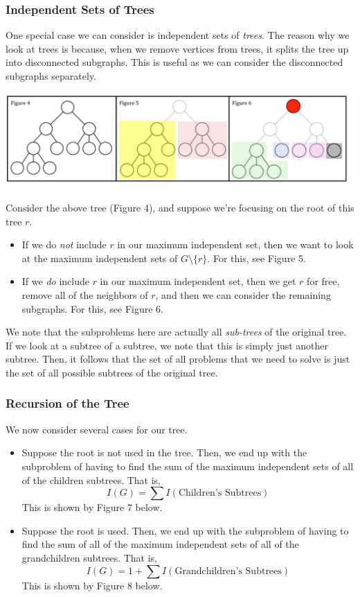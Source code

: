 \documentclass[letterpaper]{article}
\begin{document}
\subsubsection{Independent Sets of Trees}
One special case we can consider is independent sets of \emph{trees}. The reason why we look at trees is because, when we remove vertices from trees, it splits the tree up into disconnected subgraphs. This is useful as we can consider the disconnected subgraphs separately.
\begin{center}
    \includegraphics[scale=0.35]{../assets/indep_set_tree.png}
\end{center}
Consider the above tree (Figure 4), and suppose we're focusing on the root of this tree $r$.
\begin{itemize}
    \item If we do \emph{not} include $r$ in our maximum independent set, then we want to look at the maximum independent sets of $G \setminus \{r\}$. For this, see Figure 5. 
    \item If we \emph{do} include $r$ in our maximum independent set, then we get $r$ for free, remove all of the neighbors of $r$, and then we can consider the remaining subgraphs. For this, see Figure 6. 
\end{itemize}
We note that the subproblems here are actually all \emph{sub-trees} of the original tree. If we look at a subtree of a subtree, we note that this is simply just another subtree. Then, it follows that the set of all problems that we need to solve is just the set of all possible subtrees of the original tree. 

\subsubsection{Recursion of the Tree}
We now consider several cases for our tree. 
\begin{itemize}
    \item Suppose the root is not used in the tree. Then, we end up with the subproblem of having to find the sum of the maximum independent sets of all of the children subtrees. That is, 
    \[I(G) = \sum I(\text{Children's Subtrees})\]
    This is shown by Figure 7 below.

    \item Suppose the root is used. Then, we end up with the subproblem of having to find the sum of all of the maximum independent sets of all of the grandchildren subtrees. That is, 
    \[I(G) = 1 + \sum I(\text{Grandchildren's Subtrees})\]
    This is shown by Figure 8 below.
\end{itemize}
\end{document}
